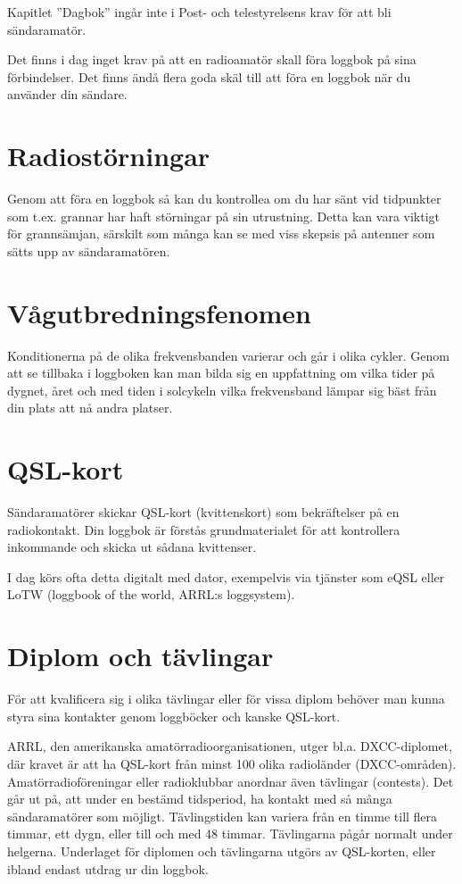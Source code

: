 Kapitlet ”Dagbok” ingår inte i Post- och
telestyrelsens krav för att bli sändaramatör.

Det finns i dag inget krav på att en radioamatör skall föra loggbok på sina förbindelser. Det finns ändå flera goda skäl till att föra en loggbok när du använder din sändare. 


\section{Radiostörningar}

Genom att föra en loggbok så kan du kontrollea om du har sänt vid tidpunkter som t.ex. grannar har haft störningar på sin utrustning. Detta kan vara viktigt för grannsämjan, särskilt som många kan se med viss skepsis på antenner som sätts upp av sändaramatören.

\section{Vågutbredningsfenomen}

Konditionerna på de olika frekvensbanden varierar och går i olika cykler. Genom att se tillbaka i loggboken kan man bilda sig en uppfattning om vilka tider på dygnet, året och med tiden i solcykeln vilka frekvensband lämpar sig bäst från din plats att nå andra platser.

\section{QSL-kort}

Sändaramatörer skickar QSL-kort (kvittenskort) som bekräftelser på en radiokontakt. Din loggbok är förstås grundmaterialet för att kontrollera inkommande och skicka ut sådana kvittenser.

I dag körs ofta detta digitalt med dator, exempelvis via tjänster som eQSL eller LoTW (loggbook of the world, ARRL:s loggsystem).

\section{Diplom och tävlingar}

För att kvalificera sig i olika tävlingar eller för vissa diplom behöver man kunna styra sina kontakter genom loggböcker och kanske QSL-kort. 

ARRL, den amerikanska amatörradioorganisationen, utger bl.a. DXCC-diplomet,
där kravet är att ha QSL-kort från minst 100 olika radioländer (DXCC-områden).
Amatörradioföreningar eller radioklubbar anordnar även tävlingar (contests). Det går
ut på, att under en bestämd tidsperiod, ha kontakt med så många sändaramatörer som
möjligt. Tävlingstiden kan variera från en timme till flera timmar, ett dygn, eller till och med 48 timmar. Tävlingarna pågår normalt under helgerna. Underlaget för diplomen och tävlingarna utgörs av QSL-korten, eller ibland endast utdrag ur din loggbok.


